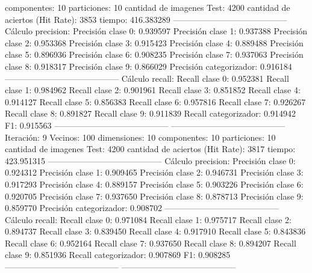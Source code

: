 componentes: 10
particiones: 10
cantidad de imagenes Test: 4200
cantidad de aciertos (Hit Rate): 3853
tiempo: 416.383289
-----------------------------------------
Cálculo precision: 
Precisión clase 0: 0.939597
Precisión clase 1: 0.937388
Precisión clase 2: 0.953368
Precisión clase 3: 0.915423
Precisión clase 4: 0.889488
Precisión clase 5: 0.896936
Precisión clase 6: 0.908235
Precisión clase 7: 0.937063
Precisión clase 8: 0.918317
Precisión clase 9: 0.866029
Precisión categorizador: 0.916184
-----------------------------------------
Cálculo recall: 
Recall clase 0: 0.952381
Recall clase 1: 0.984962
Recall clase 2: 0.901961
Recall clase 3: 0.851852
Recall clase 4: 0.914127
Recall clase 5: 0.856383
Recall clase 6: 0.957816
Recall clase 7: 0.926267
Recall clase 8: 0.891827
Recall clase 9: 0.911839
Recall categorizador: 0.914942
F1: 0.915563
-----------------------------------------
-----------------------------------------
Iteración: 9
Vecinos: 100
dimensiones: 10
componentes: 10
particiones: 10
cantidad de imagenes Test: 4200
cantidad de aciertos (Hit Rate): 3817
tiempo: 423.951315
-----------------------------------------
Cálculo precision: 
Precisión clase 0: 0.924312
Precisión clase 1: 0.909465
Precisión clase 2: 0.946731
Precisión clase 3: 0.917293
Precisión clase 4: 0.889157
Precisión clase 5: 0.903226
Precisión clase 6: 0.920705
Precisión clase 7: 0.937650
Precisión clase 8: 0.878713
Precisión clase 9: 0.859770
Precisión categorizador: 0.908702
-----------------------------------------
Cálculo recall: 
Recall clase 0: 0.971084
Recall clase 1: 0.975717
Recall clase 2: 0.894737
Recall clase 3: 0.839450
Recall clase 4: 0.917910
Recall clase 5: 0.843836
Recall clase 6: 0.952164
Recall clase 7: 0.937650
Recall clase 8: 0.894207
Recall clase 9: 0.851936
Recall categorizador: 0.907869
F1: 0.908285
-----------------------------------------
-----------------------------------------
